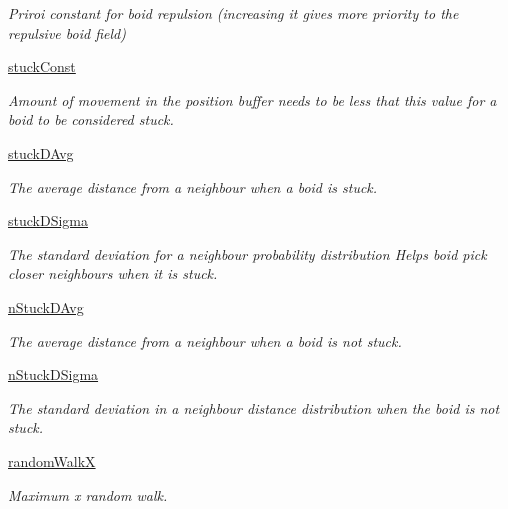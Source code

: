 \begin{DoxyCompactItemize}
\begin{DoxyCompactList}\small\item\em Priroi constant for boid repulsion (increasing it gives more priority to the repulsive boid field) \end{DoxyCompactList}\item 
\hyperlink{classboid_1_1Boid_abbcf546137204a45278b6caa95c4378b}{stuck\-Const}
\begin{DoxyCompactList}\small\item\em Amount of movement in the position buffer needs to be less that this value for a boid to be considered stuck. \end{DoxyCompactList}\item 
\hyperlink{classboid_1_1Boid_a663164af1a20323f49e002d7576914f7}{stuck\-D\-Avg}
\begin{DoxyCompactList}\small\item\em The average distance from a neighbour when a boid is stuck. \end{DoxyCompactList}\item 
\hyperlink{classboid_1_1Boid_a03960faefd59c4a651442eb373aa5c15}{stuck\-D\-Sigma}
\begin{DoxyCompactList}\small\item\em The standard deviation for a neighbour probability distribution Helps boid pick closer neighbours when it is stuck. \end{DoxyCompactList}\item 
\hyperlink{classboid_1_1Boid_acdfca1dc9b177a512502c6af681bfa9e}{n\-Stuck\-D\-Avg}
\begin{DoxyCompactList}\small\item\em The average distance from a neighbour when a boid is not stuck. \end{DoxyCompactList}\item 
\hyperlink{classboid_1_1Boid_add42a1be4f79d1ae8990065fa7e5d4de}{n\-Stuck\-D\-Sigma}
\begin{DoxyCompactList}\small\item\em The standard deviation in a neighbour distance distribution when the boid is not stuck. \end{DoxyCompactList}\item 
\hyperlink{classboid_1_1Boid_a996d92e215eb56d98a811c86c7118637}{random\-Walk\-X}
\begin{DoxyCompactList}\small\item\em Maximum x random walk. \end{DoxyCompactList}\item 

\end{DoxyCompactItemize}
